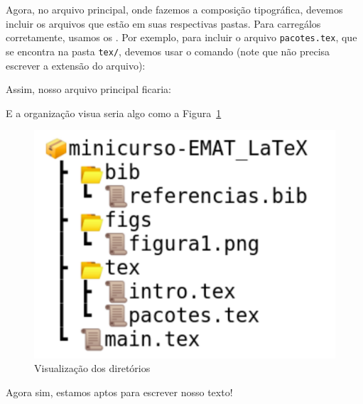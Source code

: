 Agora, no arquivo principal, onde fazemos a composição tipográfica, devemos incluir 
os arquivos que estão em suas respectivas pastas.
Para carregálos corretamente, usamos os {}.
Por exemplo, para incluir o arquivo \texttt{pacotes.tex}, que se encontra na pasta 
\texttt{tex/}, devemos usar o comando (note que não precisa escrever a extensão 
do arquivo):\\


Assim, nosso arquivo principal ficaria:


E a organização visua seria algo como a Figura~\ref{fig:diretorios}

\begin{figure}[!htbp]
  \centering
  \includegraphics[width=0.45\linewidth]{diretorios}
  \caption{Visualização dos diretórios}
  \label{fig:diretorios}  
\end{figure}

Agora sim, estamos aptos para escrever nosso texto!